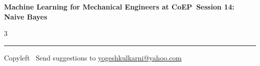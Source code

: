 \documentclass[8pt,landscape]{article}
\begin{document}
\footnotesize

\begin{center}
\Large{\textbf{Machine Learning for Mechanical Engineers at CoEP\ Session 14: Naive Bayes}}
\end{center}

\begin{multicols}{3}

\end{multicols}

\rule{\linewidth}{0.25pt}
\scriptsize
Copyleft \textcopyleft\  Send suggestions to
\href{http://www.yogeshkulkarni.com}{yogeshkulkarni@yahoo.com}
\end{document}
